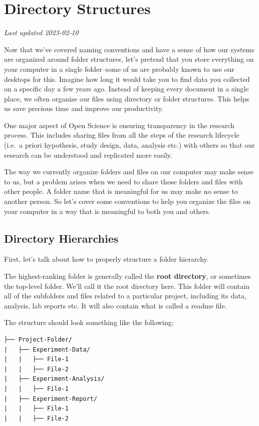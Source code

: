 \documentclass[
]{book}
\begin{document}
\hypertarget{directory-structures}{%
\chapter{Directory Structures}\label{directory-structures}}

\emph{Last updated 2023-02-10}

Now that we've covered naming conventions and have a sense of how our systems are organized around folder structures, let's pretend that you store everything on your computer in a single folder--some of us are probably known to use our desktops for this. Imagine how long it would take you to find data you collected on a specific day a few years ago. Instead of keeping every document in a single place, we often organize our files using directory or folder structures. This helps us save precious time and improve our productivity.

One major aspect of Open Science is ensuring transparency in the research process. This includes sharing files from all the steps of the research lifecycle (i.e.~a priori hypothesis, study design, data, analysis etc.) with others so that our research can be understood and replicated more easily.

The way we currently organize folders and files on our computer may make sense to us, but a problem arises when we need to share those folders and files with other people. A folder name that is meaningful for us may make no sense to another person. So let's cover some conventions to help you organize the files on your computer in a way that is meaningful to both you and others.

\hypertarget{directory-hierarchies}{%
\section{Directory Hierarchies}\label{directory-hierarchies}}

First, let's talk about how to properly structure a folder hierarchy.

The highest-ranking folder is generally called the \textbf{root directory}, or sometimes the top-level folder. We'll call it the root directory here. This folder will contain all of the subfolders and files related to a particular project, including its data, analysis, lab reports etc. It will also contain what is called a readme file.

The structure should look something like the following:

\begin{verbatim}
├── Project-Folder/
|   ├── Experiment-Data/
|   |   ├── File-1
|   |   ├── File-2
|   ├── Experiment-Analysis/
|   |   ├── File-1
|   ├── Experiment-Report/
|   |   ├── File-1
|   |   ├── File-2
\end{verbatim}
\end{document}
